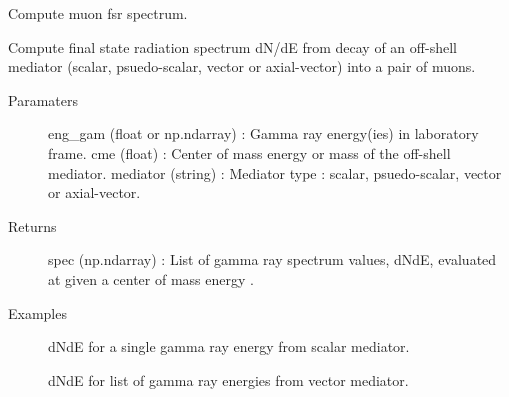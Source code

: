 \documentclass[letterpaper,10pt,english]{sphinxmanual}
\begin{document}
\begin{fulllineitems}
\begin{description}
\end{description}

\end{fulllineitems}


\begin{fulllineitems}
\label{\detokenize{modules:hazma.muon.fsr}}
Compute muon fsr spectrum.

Compute final state radiation spectrum dN/dE from decay of an off-shell
mediator (scalar, psuedo-scalar, vector or axial-vector) into a pair of
muons.
\begin{description}
\item[{Paramaters}] \leavevmode
eng\_gam (float or np.ndarray) : Gamma ray energy(ies) in laboratory
frame.
cme (float) : Center of mass energy or mass of the off-shell mediator.
mediator (string) : Mediator type : scalar, psuedo-scalar, vector or
axial-vector.

\item[{Returns}] \leavevmode
spec (np.ndarray) : List of gamma ray spectrum values, dNdE, evaluated
at  given a center of mass energy .

\item[{Examples}] \leavevmode
dNdE for a single gamma ray energy from scalar mediator.

\begin{sphinxVerbatim}[commandchars=\\\{\}]
   
    
    
\end{sphinxVerbatim}

dNdE for list of gamma ray energies from vector mediator.


\end{description}
\end{fulllineitems}
\end{document}
